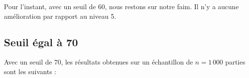 \begin{center}
\end{center}

Pour l'instant, avec un seuil de 60, nous restons sur notre faim. Il n'y a aucune amélioration par rapport au niveau 5.



\newpage

\subsection{Seuil égal à 70}
Avec un seuil de 70, les résultats obtenues sur un échantillon de $n=1\,000$ parties sont les suivants :

\begin{center}
\end{center}

